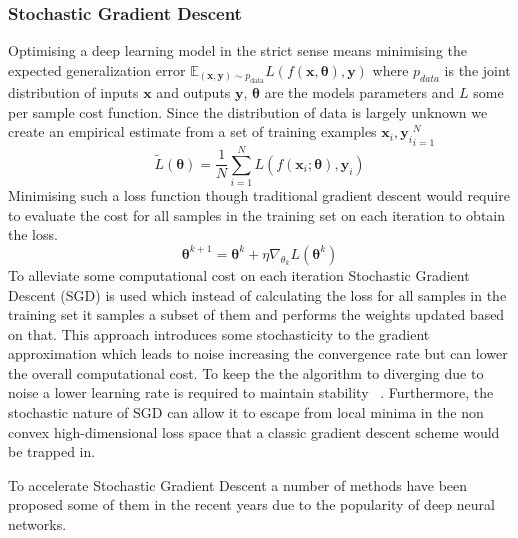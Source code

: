 \documentclass[11pt]{report}
\begin{document}
    \subsubsection{Stochastic Gradient Descent}
    Optimising a deep learning model in the strict sense means minimising the expected generalization error
    $\mathbb{E}_{(\pmb{x},\pmb{y}) \sim p_{\text{data}}} L(f(\pmb{x},\pmb\theta),\pmb{y})$ where $p_{data}$ is the joint
    distribution of inputs $\pmb{x}$ and outputs $\pmb{y}$, $\pmb\theta$ are the models parameters and $L$ some per
    sample cost function.
    Since the distribution of data is largely unknown we create an empirical estimate from a set of training examples
    ${\pmb{x}_i,\pmb{y}_i}_{i=1}^{N}$
    \begin{equation*}
        \tilde L(\pmb\theta ) = \frac{1}{N} \sum_{i=1}^N L( f(\pmb{x}_i; \pmb\theta), \pmb{y}_i )
    \end{equation*}
    Minimising such a loss function though traditional gradient descent would require to evaluate the cost for all
    samples in the training set on each iteration to obtain the loss.
    \begin{equation*}
        \pmb\theta^{k+1} = \pmb\theta^{k} + \eta \nabla_{\theta_k} L(\pmb\theta^{k})
    \end{equation*}
    To alleviate some computational cost on each iteration Stochastic Gradient Descent (SGD) is used which instead of calculating
    the loss for all samples in the training set it samples a subset of them and performs the weights updated based
    on that.
    This approach introduces some stochasticity to the gradient approximation which leads to noise increasing the
    convergence rate but can lower the overall computational cost.
    To keep the the algorithm to diverging due to noise a lower learning rate is required to maintain stability
    ~\cite{kiwiel2001convergence}.
    Furthermore, the stochastic nature of SGD can allow it to escape from local minima in the non convex
    high-dimensional loss space that a classic gradient descent scheme would be trapped in.

    To accelerate Stochastic Gradient Descent a number of methods have been proposed some of them in the recent years due
    to the popularity of deep neural networks.
\end{document}
